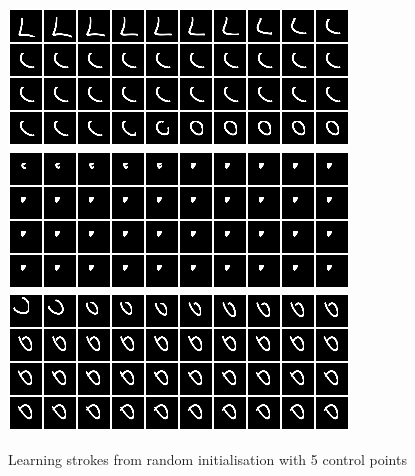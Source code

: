 \documentclass{article}
\begin{document}
\begin{figure}[htb!]
\includegraphics[scale=0.25]{../results/debug_recon/rand_init8.png}
\includegraphics[scale=0.25]{../results/debug_recon/rand_init9.png}
\includegraphics[scale=0.25]{../results/debug_recon/rand_init10.png}
\caption{Learning strokes from random initialisation with 5 control points}
\label{fig:shiftedinitrand5}
\end{figure}
\end{document}
